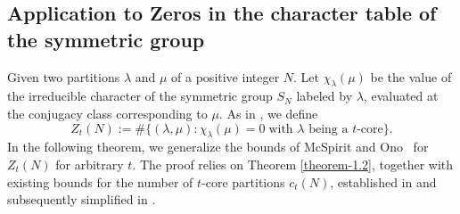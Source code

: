 \documentclass[11pt]{amsart}
\theoremstyle{plain}
\numberwithin{equation}{section}
\begin{document}
	\subsection{\texorpdfstring{Application to Zeros in the character table of the symmetric group}{ Applications of Theorem 1.2}} 
	Given two partitions $\lambda$ and $\mu$ of a positive integer $N$. Let $\chi_{\lambda}(\mu)$ be the value of the irreducible character of the symmetric group $S_{N}$ labeled by $\lambda$, evaluated at the conjugacy class corresponding to $\mu$. As in \cite{mcspirit2023zeros}, we define
	\begin{equation*}
		Z_{t}(N) := \#\{(\lambda,\mu) : \chi_{\lambda}(\mu) = 0 \; \text{with $\lambda$ being a $t$-core}\}.
	\end{equation*}
	In the following theorem, we generalize the bounds of McSpirit and Ono~\cite{mcspirit2023zeros} for $Z_t(N)$ for arbitrary $t$. 
	The proof relies on Theorem \ref{theorem-1.2}, together with existing bounds for the number of $t$-core partitions $c_t(N)$, established in \cite{tyler2024asymptotics, tyler2024tcore} and subsequently simplified in \cite{barman2025lower}.
\end{document}
